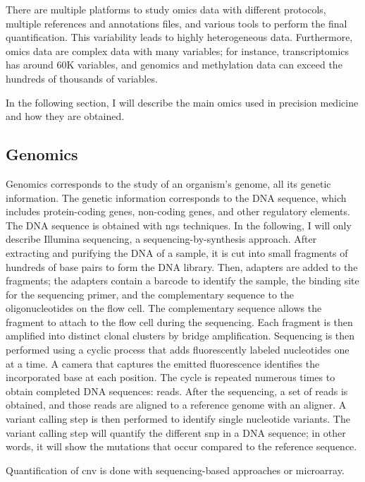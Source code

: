 \documentclass[../main.tex]{subfiles}
\begin{document}
 There are multiple platforms to study omics data with different protocols, multiple references and annotations files, and various tools to perform the final quantification.
 This variability leads to highly heterogeneous data.
 Furthermore, omics data are complex data with many variables; for instance, transcriptomics has around 60K variables, and genomics and methylation data can exceed the hundreds of thousands of variables.

 In the following section, I will describe the main omics used in precision medicine and how they are obtained.

 \subsection{Genomics}\label{subsec:genomics}
	 Genomics corresponds to the study of an organism's genome, \ie{}all its genetic information.
	 The genetic information corresponds to the DNA sequence, which includes protein-coding genes, non-coding genes, and other regulatory elements.
	 The DNA sequence is obtained with \gls{ngs} techniques.
	 In the following, I will only describe Illumina sequencing, a sequencing-by-synthesis approach.
	 After extracting and purifying the DNA of a sample, it is cut into small fragments of hundreds of base pairs to form the DNA library.
	 Then, adapters are added to the fragments; the adapters contain a barcode to identify the sample, the binding site for the sequencing primer, and the complementary sequence to the oligonucleotides on the flow cell.
	 The complementary sequence allows the fragment to attach to the flow cell during the sequencing.
	 Each fragment is then amplified into distinct clonal clusters by bridge amplification.
	 Sequencing is then performed using a cyclic process that adds fluorescently labeled nucleotides one at a time.
	 A camera that captures the emitted fluorescence identifies the incorporated base at each position.
	 The cycle is repeated numerous times to obtain completed DNA sequences: reads.
	 After the sequencing, a set of reads is obtained, and those reads are aligned to a reference genome with an aligner.
	 A variant calling step is then performed to identify single nucleotide variants.
	 The variant calling step will quantify the different \gls{snp} in a DNA sequence; in other words, it will show the mutations that occur compared to the reference sequence.

	 Quantification of \gls{cnv} is done with sequencing-based approaches or microarray.
\end{document}
